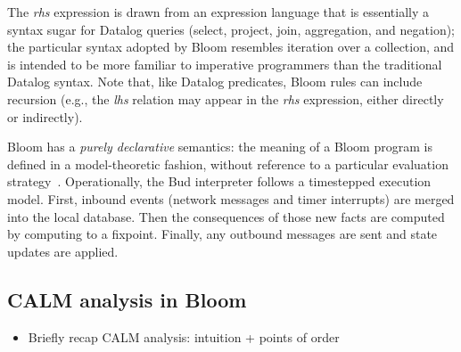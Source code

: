 The \emph{rhs} expression is drawn from an expression language that is
essentially a syntax sugar for Datalog queries (select, project, join,
aggregation, and negation); the particular syntax adopted by Bloom resembles
iteration over a collection, and is intended to be more familiar to imperative
programmers than the traditional Datalog syntax. Note that, like Datalog
predicates, Bloom rules can include recursion (e.g., the \emph{lhs} relation may
appear in the \emph{rhs} expression, either directly or indirectly).

Bloom has a \emph{purely declarative} semantics: the meaning of a Bloom program
is defined in a model-theoretic fashion, without reference to a particular
evaluation strategy~\cite{dedalus}. Operationally, the Bud interpreter follows a
timestepped execution model. First, inbound events (network messages and timer
interrupts) are merged into the local database. Then the consequences of those
new facts are computed by computing to a fixpoint. Finally, any outbound
messages are sent and state updates are applied.

\subsection{CALM analysis in Bloom}
\begin{itemize}
\item Briefly recap CALM analysis: intuition + points of order
\end{itemize}
